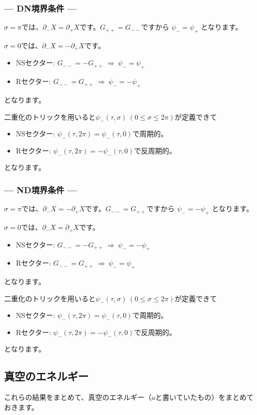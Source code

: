 \documentclass[report,paper=a4, fontsize=12pt, line_length=16cm, number_of_lines=34,dvipdfmx]{jlreq}
\numberwithin{equation}{chapter}
\numberwithin{equation}{section}
\newcommand{\del}{\partial}
\begin{document}
\subsubsection*{--- DN境界条件 ---}
$\sigma=\pi$では、$\del_{-}X=\del_{+}X$です。$G_{++}=G_{--}$ですから
$\psi_{-}=\psi_{+}$
となります。

$\sigma=0$では、$\del_{-}X=-\del_{+}X$です。
\begin{itemize}
  \item NSセクター: $G_{--}=-G_{++}\ \Rightarrow\ 
  \psi_{-}=\psi_{+}$
  \item Rセクター: $G_{--}=G_{++}\ \Rightarrow\ 
  \psi_{-}=-\psi_{+}$
\end{itemize}
となります。

二重化のトリックを用いると$\psi_{-}(\tau,\sigma)\ (0\le \sigma \le 2\pi)$が定義できて
\begin{itemize}
  \item NSセクター: $\psi_{-}(\tau,2\pi)=\psi_{-}(\tau,0)$で周期的。
  \item Rセクター: $\psi_{-}(\tau,2\pi)=-\psi_{-}(\tau,0)$で反周期的。
\end{itemize}
となります。


\subsubsection*{--- ND境界条件 ---}
$\sigma=\pi$では、$\del_{-}X=-\del_{+}X$です。$G_{--}=G_{++}$ですから
$\psi_{-}=-\psi_{+}$
となります。

$\sigma=0$では、$\del_{-}X=\del_{+}X$です。
\begin{itemize}
  \item NSセクター: $G_{--}=-G_{++}\ \Rightarrow\ 
  \psi_{-}=-\psi_{+}$
  \item Rセクター: $G_{--}=G_{++}\ \Rightarrow\ 
  \psi_{-}=\psi_{+}$
\end{itemize}
となります。

二重化のトリックを用いると$\psi_{-}(\tau,\sigma)\ (0\le \sigma \le 2\pi)$が定義できて
\begin{itemize}
  \item NSセクター: $\psi_{-}(\tau,2\pi)=\psi_{-}(\tau,0)$で周期的。
  \item Rセクター: $\psi_{-}(\tau,2\pi)=-\psi_{-}(\tau,0)$で反周期的。
\end{itemize}
となります。


\subsection{真空のエネルギー}
これらの結果をまとめて、真空のエネルギー（$a$と書いていたもの）をまとめておきます。
\end{document}
